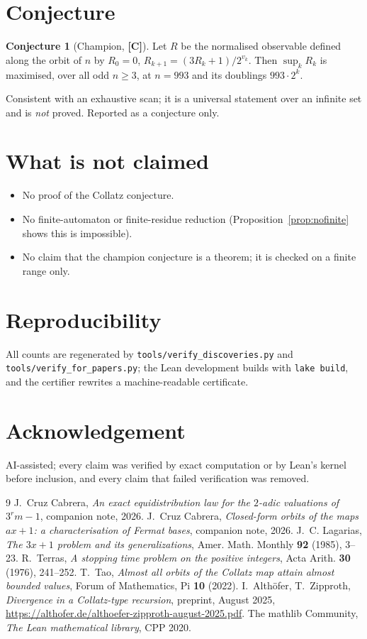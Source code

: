 \documentclass[11pt,a4paper]{article}
\theoremstyle{plain}
\theoremstyle{definition}
\newtheorem{conjecture}[theorem]{Conjecture}
\begin{document}
\section{Conjecture}
\begin{conjecture}[Champion, {\bf[C]}]
Let $R$ be the normalised observable defined along the orbit of $n$ by $R_0=0$,
$R_{k+1}=(3R_k+1)/2^{v_k}$. Then $\sup_kR_k$ is maximised, over all odd $n\ge3$, at $n=993$
and its doublings $993\cdot2^k$.
\end{conjecture}
\noindent Consistent with an exhaustive scan; it is a universal statement over an infinite set
and is \emph{not} proved. Reported as a conjecture only.

\section*{What is not claimed}
\begin{itemize}[nosep]
  \item No proof of the Collatz conjecture.
  \item No finite-automaton or finite-residue reduction (Proposition~\ref{prop:nofinite}
        shows this is impossible).
  \item No claim that the champion conjecture is a theorem; it is checked on a finite range
        only.
\end{itemize}

\section*{Reproducibility}
All counts are regenerated by \texttt{tools/verify\_discoveries.py} and
\texttt{tools/verify\_for\_papers.py}; the Lean development builds with \texttt{lake build},
and the certifier rewrites a machine-readable certificate.

\section*{Acknowledgement}
AI-assisted; every claim was verified by exact computation or by Lean's kernel before
inclusion, and every claim that failed verification was removed.

\begin{thebibliography}{9}
 J.~Cruz Cabrera, \emph{An exact equidistribution law for the $2$-adic
valuations of $3^rm-1$}, companion note, 2026.
 J.~Cruz Cabrera, \emph{Closed-form orbits of the maps $ax+1$: a
characterisation of Fermat bases}, companion note, 2026.
 J.~C. Lagarias, \emph{The $3x+1$ problem and its generalizations},
Amer. Math. Monthly \textbf{92} (1985), 3--23.
 R.~Terras, \emph{A stopping time problem on the positive integers},
Acta Arith. \textbf{30} (1976), 241--252.
 T.~Tao, \emph{Almost all orbits of the Collatz map attain almost bounded
values}, Forum of Mathematics, Pi \textbf{10} (2022).
 I.~Alth\"ofer, T.~Zipproth, \emph{Divergence in a Collatz-type recursion},
preprint, August 2025, \url{https://althofer.de/althoefer-zipproth-august-2025.pdf}.
 The mathlib Community, \emph{The Lean mathematical library}, CPP 2020.
\end{thebibliography}
\end{document}
